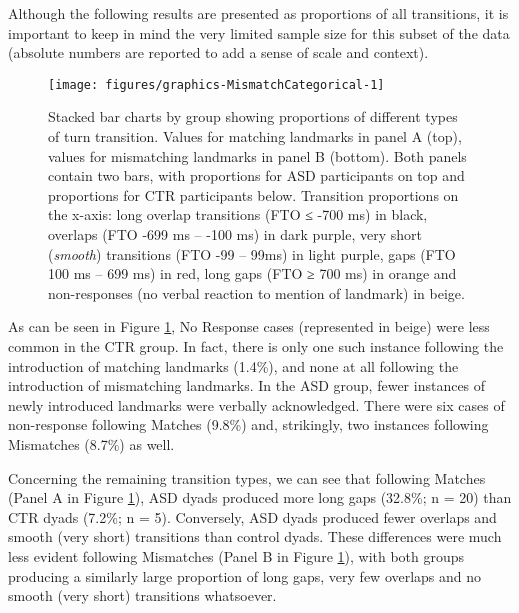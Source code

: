 Although the following results are presented as proportions of all transitions, it is important to keep in mind the very limited sample size for this subset of the data (absolute numbers are reported to add a sense of scale and context).




\begin{figure}

{\centering \texttt{[image: figures/graphics-MismatchCategorical-1]} 
	
}

\caption{Stacked bar charts by group showing proportions of different types of turn transition. Values for matching landmarks in panel A (top), values for mismatching landmarks in panel B (bottom). Both panels contain two bars, with proportions for ASD participants on top and proportions for CTR participants below.
	Transition proportions on the x-axis: long overlap transitions (FTO ≤ -700 ms) in black, overlaps (FTO -699 ms -- -100 ms) in dark purple, very short (\textit{smooth}) transitions (FTO -99 -- 99ms) in light purple, gaps (FTO 100 ms -- 699 ms) in red, long gaps (FTO ≥ 700 ms) in orange and non-responses (no verbal reaction to mention of landmark) in beige.\\}\label{fig:MismatchCategorical}
\end{figure}

As can be seen in Figure \ref{fig:MismatchCategorical}, No Response cases (represented in beige) were less common in the CTR group. In fact, there is only one such instance following the introduction of matching landmarks (1.4\%), and none at all following the introduction of mismatching landmarks.
In the ASD group, fewer instances of newly introduced landmarks were verbally acknowledged. There were six cases of non-response following Matches (9.8\%) and, strikingly, two instances following Mismatches (8.7\%) as well.

Concerning the remaining transition types, we can see that following Matches (Panel A in Figure \ref{fig:MismatchCategorical}), ASD dyads produced more long gaps (32.8\%; n = 20) than CTR dyads (7.2\%; n = 5). Conversely, ASD dyads produced fewer overlaps and smooth (very short) transitions than control dyads. These differences were much less evident following Mismatches (Panel B in Figure \ref{fig:MismatchCategorical}), with both groups producing a similarly large proportion of long gaps, very few overlaps and no smooth (very short) transitions whatsoever. 

